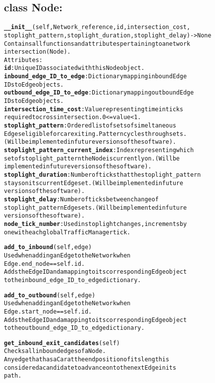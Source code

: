 \subsection{class Node:}
\begin{alltt}

\textbf{__init__}(self, Network_reference, id, intersection_cost,
stoplight_pattern, stoplight_duration, stoplight_delay) -> None
Contains all functions and attributes pertaining to a network 
intersection (Node).
Attributes:
    \textbf{id}:  Unique ID associated with this Node object.
    \textbf{inbound_edge_ID_to_edge}:  Dictionary mapping inbound Edge 
    IDs to Edge objects.
    \textbf{outbound_edge_ID_to_edge}:  Dictionary mapping outbound Edge 
    IDs to Edge objects.
    \textbf{intersection_time_cost}:  Value representing time in ticks 
    required to cross intersection.  0 <= value < 1.
    \textbf{stoplight_pattern}:  Ordered list of sets of simeltaneous 
    Edges eligible for car exiting. Pattern cycles through sets. 
    (Will be implemented in future versions of the software).
    \textbf{stoplight_pattern_current_index}:  Index representing which 
    set of stoplight_pattern the Node is currently on.  (Will be
    implemented in future versions of the software).
    \textbf{stoplight_duration}: Number of ticks that the stoplight_pattern 
    stays on its current Edge set. (Will be implemented in future 
    versions of the software).
    \textbf{stoplight_delay}: Number of ticks between change of 
    stoplight_pattern Edge sets. (Will be implemented in future 
    versions of the software).
    \textbf{node_tick_number}:  Used in stoplight changes, increments by 
    one with each global TrafficManager tick. 

\textbf{add_to_inbound}(self, edge)
Used when adding an Edge to the Network when 
Edge.end_node == self.id .
Adds the Edge ID and a mapping to its corresponding Edge object 
to the inbound_edge_ID_to_edge dictionary.

\textbf{add_to_outbound}(self, edge)
Used when adding an Edge to the Network when 
Edge.start_node == self.id .
Adds the Edge ID and a mapping to its corresponding Edge object 
to the outbound_edge_ID_to_edge dictionary.

\textbf{get_inbound_exit_candidates}(self)
Checks all inbound edges of a Node.  
Any edge that has a Car at the end position of its length is 
considered a candidate to advance on to the next Edge in its 
path.


\end{alltt}
